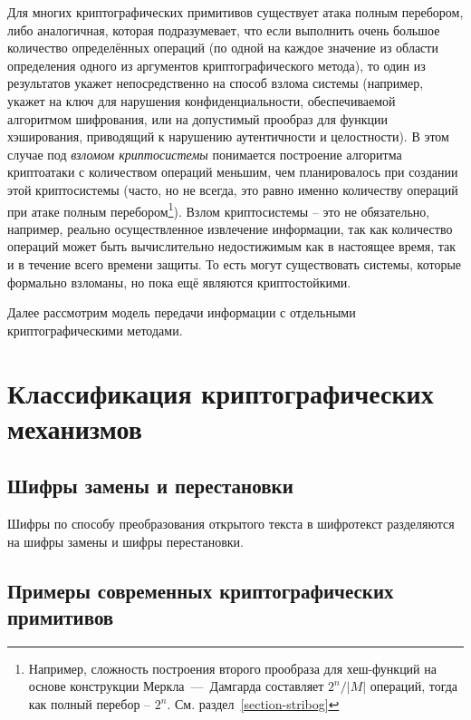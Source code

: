 Для многих криптографических примитивов существует атака полным перебором, либо аналогичная, которая подразумевает, что если выполнить очень большое количество определённых операций (по одной на каждое значение из области определения одного из аргументов криптографического метода), то один из результатов укажет непосредственно на способ взлома системы (например, укажет на ключ для нарушения конфиденциальности, обеспечиваемой алгоритмом шифрования, или на допустимый прообраз для функции хэширования, приводящий к нарушению аутентичности и целостности). В этом случае под \emph{взломом криптосистемы} понимается построение алгоритма криптоатаки с количеством операций меньшим, чем планировалось при создании этой криптосистемы (часто, но не всегда, это равно именно количеству операций при атаке полным перебором\footnote{Например, сложность построения второго прообраза для хеш-функций на основе конструкции Меркла~---~Дамгарда составляет $2^n / \left|M\right|$ операций, тогда как полный перебор -- $2^n$. См. раздел~\ref{section-stribog}}). Взлом криптосистемы – это не обязательно, например, реально осуществленное извлечение информации, так как количество операций может быть вычислительно недостижимым как в настоящее время, так и в течение всего времени защиты. То есть могут существовать системы, которые формально взломаны, но пока ещё являются криптостойкими.

Далее рассмотрим модель передачи информации с отдельными криптографическими методами.



\section[Классификация]{Классификация криптографических механизмов}


\subsection{Шифры замены и перестановки}

Шифры по способу преобразования открытого текста в шифротекст разделяются на шифры замены и шифры перестановки.







\subsection{Примеры современных криптографических примитивов}

